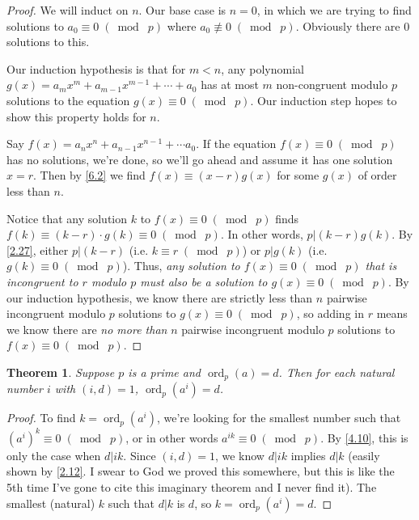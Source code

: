 \documentclass{article}
\DeclareMathOperator{\ord}{ord}
\newtheorem{thm}{Theorem}[section]
\numberwithin{equation}{thm}
\providecommand{\gmod}[1]{\; (\bmod \; #1)}
\begin{document}
\begin{proof}
  We will induct on $n$. Our base case is $n = 0$, in which we are trying to find solutions to $a_0 \equiv 0 \gmod p$ where $a_0 \not \equiv 0 \gmod p$. Obviously there are $0$ solutions to this.

  Our induction hypothesis is that for $m < n$, any polynomial $g(x) = a_m x^m + a_{m-1} x^{m-1} + \cdots + a_0$ has at most $m$ non-congruent modulo $p$ solutions to the equation $g(x) \equiv 0 \gmod p$. Our induction step hopes to show this property holds for $n$.

  Say $f(x) = a_n x^n + a_{n-1} x^{n-1} + \cdots a_0$. If the equation $f(x) \equiv 0 \gmod p$ has no solutions, we're done, so we'll go ahead and assume it has one solution $x = r$. Then by \ref{6.2} we find $f(x) \equiv (x-r) g(x)$ for some $g(x)$ of order less than $n$.

  Notice that any solution $k$ to $f(x) \equiv 0 \gmod p$ finds $f(k) \equiv (k-r) \cdot g(k) \equiv 0 \gmod p$. In other words, $p | (k-r)g(k)$. By \ref{2.27}, either $p | (k-r)$ (i.e. $k \equiv r \gmod p$) or $p | g(k)$ (i.e. $g(k) \equiv 0 \gmod p$).
  Thus, \emph{any solution to $f(x) \equiv 0 \gmod p$ that is incongruent to $r$ modulo $p$ must also be a solution to $g(x) \equiv 0 \gmod p$}. By our induction hypothesis, we know there are strictly less than $n$ pairwise incongruent modulo $p$ solutions to $g(x) \equiv 0 \gmod p$, so adding in $r$ means we know there are \emph{no more than} $n$ pairwise incongruent modulo $p$ solutions to  $f(x) \equiv 0 \gmod p$.
\end{proof}



\begin{thm} \label{6.4}
  Suppose $p$ is a prime and $\ord_p (a) = d$. Then for each natural number $i$ with $(i, d) = 1$, $\ord_p(a^i) = d$.
\end{thm}

\begin{proof}
  To find $k = \ord_p (a^i)$, we're looking for the smallest number such that $(a^i)^k \equiv 0 \gmod p$, or in other words $a^{ik} \equiv 0 \gmod p$. By \ref{4.10}, this is only the case when $d | ik$. Since $(i, d) = 1$, we know $d | ik$ implies $d | k$ (easily shown by \ref{2.12}. I swear to God we proved this somewhere, but this is like the 5th time I've gone to cite this imaginary theorem and I never find it). The smallest (natural) $k$ such that $d | k$ is $d$, so $k = \ord_p (a^i) = d$.
\end{proof}
\end{document}
